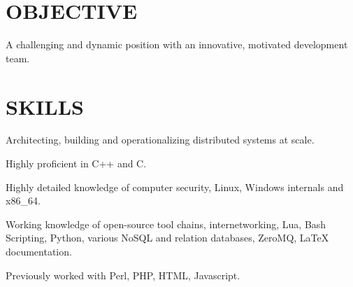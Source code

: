 \documentclass[margin]{res}
\begin{document}
 
 

\address{david.andrews112@gmail.com \ \ \ (949) 633-0588}


 
\begin{resume}  

\section{OBJECTIVE}
A challenging and dynamic position with an innovative, motivated development team.


\section{SKILLS}
\begin{list}{}{\leftmargin=0em \topsep=0pt \partopsep=0pt \parsep=2.5pt}
  \item Architecting, building and operationalizing distributed systems at scale.
  \item Highly proficient in C++ and C.
  \item Highly detailed knowledge of computer security, Linux, Windows internals and x86\_64.
  \item Working knowledge of open-source tool chains, internetworking,
    Lua, Bash Scripting, Python, various NoSQL and relation databases,
    ZeroMQ, \LaTeX{} documentation.
  \item Previously worked with Perl, PHP, HTML, Javascript.
\end{list}






\end{resume}
\end{document}
